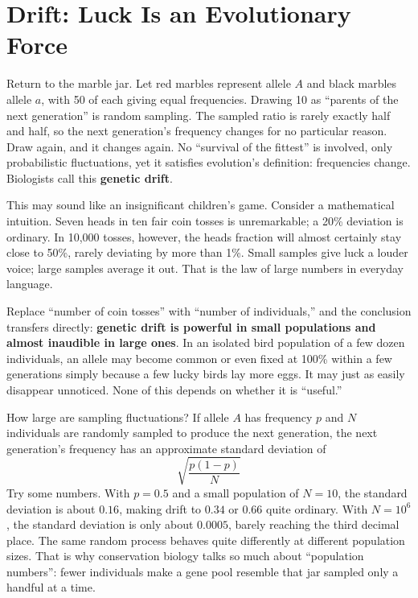 \section{Drift: Luck Is an Evolutionary Force}

Return to the marble jar. Let red marbles represent allele $A$ and black marbles allele $a$, with 50 of each giving equal frequencies. Drawing 10 as ``parents of the next generation'' is random sampling. The sampled ratio is rarely exactly half and half, so the next generation's frequency changes for no particular reason. Draw again, and it changes again. No ``survival of the fittest'' is involved, only probabilistic fluctuations, yet it satisfies evolution's definition: frequencies change. Biologists call this \textbf{genetic drift}.

This may sound like an insignificant children's game. Consider a mathematical intuition. Seven heads in ten fair coin tosses is unremarkable; a 20\% deviation is ordinary. In 10,000 tosses, however, the heads fraction will almost certainly stay close to 50\%, rarely deviating by more than 1\%. Small samples give luck a louder voice; large samples average it out. That is the law of large numbers in everyday language.

Replace ``number of coin tosses'' with ``number of individuals,'' and the conclusion transfers directly: \textbf{genetic drift is powerful in small populations and almost inaudible in large ones}. In an isolated bird population of a few dozen individuals, an allele may become common or even fixed at 100\% within a few generations simply because a few lucky birds lay more eggs. It may just as easily disappear unnoticed. None of this depends on whether it is ``useful.''

\begin{qiaoliang}
How large are sampling fluctuations? If allele $A$ has frequency $p$ and $N$ individuals are randomly sampled to produce the next generation, the next generation's frequency has an approximate standard deviation of
\[
\sqrt{\frac{p(1-p)}{N}}
\]
Try some numbers. With $p=0.5$ and a small population of $N=10$, the standard deviation is about $0.16$, making drift to $0.34$ or $0.66$ quite ordinary. With $N=10^{6}$, the standard deviation is only about $0.0005$, barely reaching the third decimal place. The same random process behaves quite differently at different population sizes. That is why conservation biology talks so much about ``population numbers'': fewer individuals make a gene pool resemble that jar sampled only a handful at a time.
\end{qiaoliang}


